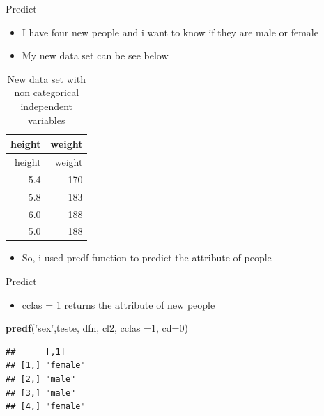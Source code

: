\documentclass[
  10pt,
  ignorenonframetext,
]{beamer}
\newenvironment{Shaded}{\begin{snugshade}}{\end{snugshade}}
\newcommand{\DataTypeTok}[1]{\textcolor[rgb]{0.13,0.29,0.53}{#1}}
\newcommand{\DecValTok}[1]{\textcolor[rgb]{0.00,0.00,0.81}{#1}}
\newcommand{\KeywordTok}[1]{\textcolor[rgb]{0.13,0.29,0.53}{\textbf{#1}}}
\newcommand{\NormalTok}[1]{#1}
\newcommand{\StringTok}[1]{\textcolor[rgb]{0.31,0.60,0.02}{#1}}
\providecommand{\tightlist}{%
  \setlength{\itemsep}{0pt}\setlength{\parskip}{0pt}}
\begin{document}
\begin{frame}{Predict}
\protect\hypertarget{predict-3}{}

\begin{itemize}
\tightlist
\item
  I have four new people and i want to know if they are male or female
\item
  My new data set can be see below
\end{itemize}

\begin{longtable}[]{@{}rr@{}}
\caption{New data set with non categorical independent
variables}\tabularnewline
\toprule
height & weight\tabularnewline
\midrule
\endfirsthead
\toprule
height & weight\tabularnewline
\midrule
\endhead
5.4 & 170\tabularnewline
5.8 & 183\tabularnewline
6.0 & 188\tabularnewline
5.0 & 188\tabularnewline
\bottomrule
\end{longtable}

\begin{itemize}
\tightlist
\item
  So, i used predf function to predict the attribute of people
\end{itemize}

\end{frame}

\begin{frame}[fragile]{Predict}
\protect\hypertarget{predict-4}{}

\begin{itemize}
\tightlist
\item
  cclas = 1 returns the attribute of new people
\end{itemize}

\begin{Shaded}
\begin{Highlighting}[]
\KeywordTok{predf}\NormalTok{(}\StringTok{'sex'}\NormalTok{,teste, dfn, cl2, }\DataTypeTok{cclas =}\DecValTok{1}\NormalTok{, }\DataTypeTok{cd=}\DecValTok{0}\NormalTok{)}
\end{Highlighting}
\end{Shaded}

\begin{verbatim}
##      [,1]    
## [1,] "female"
## [2,] "male"  
## [3,] "male"  
## [4,] "female"
\end{verbatim}

\end{frame}
\end{document}
